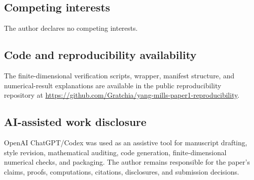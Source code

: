 \documentclass[10pt]{article}
\begin{document}
\subsection{Competing interests}

The author declares no competing interests.

\subsection{Code and reproducibility availability}

The finite-dimensional verification scripts, wrapper, manifest structure, and numerical-result explanations are available in the public reproducibility repository at \url{https://github.com/Gratchia/yang-mills-paper1-reproducibility}.

\subsection{AI-assisted work disclosure}

OpenAI ChatGPT/Codex was used as an assistive tool for manuscript drafting, style revision, mathematical auditing, code generation, finite-dimensional numerical checks, and packaging.  The author remains responsible for the paper's claims, proofs, computations, citations, disclosures, and submission decisions.
\end{document}

